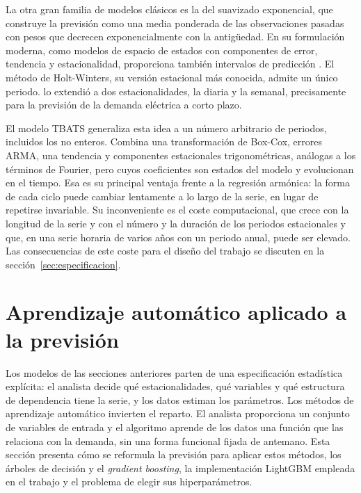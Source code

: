 La otra gran familia de modelos clásicos es la del suavizado exponencial,
que construye la previsión como una media ponderada de las observaciones
pasadas con pesos que decrecen exponencialmente con la antigüedad. En su
formulación moderna, como modelos de espacio de estados con componentes de
error, tendencia y estacionalidad, proporciona también intervalos de
predicción \parencite{hyndman2021fpp3}. El método de Holt-Winters, su versión
estacional más conocida, admite un único periodo. \textcite{taylor2003short}
lo extendió a dos estacionalidades, la diaria y la semanal, precisamente para
la previsión de la demanda eléctrica a corto plazo.

El modelo TBATS \parencite{delivera2011forecasting} generaliza esta idea a un
número arbitrario de periodos, incluidos los no enteros. Combina una
transformación de Box-Cox, errores ARMA, una tendencia y componentes
estacionales trigonométricas, análogas a los términos de Fourier, pero cuyos
coeficientes son estados del modelo y evolucionan en el tiempo. Esa es su
principal ventaja frente a la regresión armónica: la forma de cada ciclo
puede cambiar lentamente a lo largo de la serie, en lugar de repetirse
invariable. Su inconveniente es el coste computacional, que crece con la
longitud de la serie y con el número y la duración de los periodos
estacionales y que, en una serie horaria de varios años con un periodo
anual, puede ser elevado. Las consecuencias de este coste para el diseño del
trabajo se discuten en la sección~\ref{sec:especificacion}.

\section{Aprendizaje automático aplicado a la previsión}\label{sec:ml}

Los modelos de las secciones anteriores parten de una especificación
estadística explícita: el analista decide qué estacionalidades, qué variables
y qué estructura de dependencia tiene la serie, y los datos estiman los
parámetros. Los métodos de aprendizaje automático invierten el reparto. El
analista proporciona un conjunto de variables de entrada y el algoritmo
aprende de los datos una función que las relaciona con la demanda, sin una
forma funcional fijada de antemano. Esta sección presenta cómo se reformula
la previsión para aplicar estos métodos, los árboles de decisión y el
\textit{gradient boosting}, la implementación LightGBM empleada en el trabajo
y el problema de elegir sus hiperparámetros.


